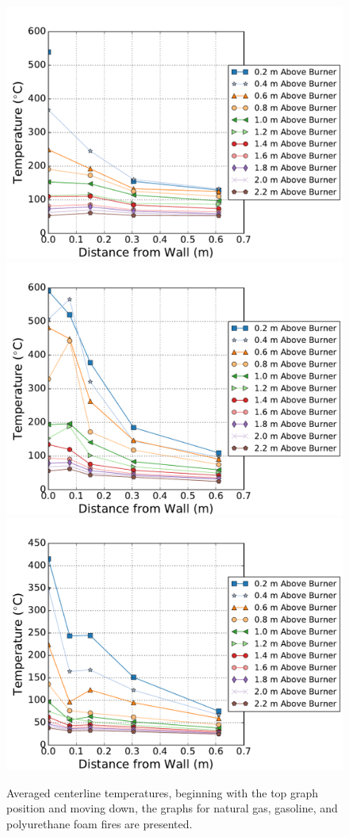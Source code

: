 \documentclass[twoside]{uocthesis}
\begin{document}
\begin{figure}[p]
	\centering
	\includegraphics[width=.625\columnwidth]{../Figures/IWGB_NG_TC_Surface_Center_Avg}\\
	\includegraphics[width=.625\columnwidth]{../Figures/IWGB_GAS_TC_Surface_Center_Avg}\\
	\includegraphics[width=.625\columnwidth]{../Figures/IWGB_PUF_TC_Surface_Center_Avg}\\
	\caption[Averaged centerline temperature for the natural gas, gasoline, and foam fires]{Averaged centerline temperatures, beginning with the top graph position and moving down, the graphs for natural gas, gasoline, and polyurethane foam fires are presented.}
	\label{IWGB_Temp_Comp_FrontCenter}
\end{figure}
\end{document}
